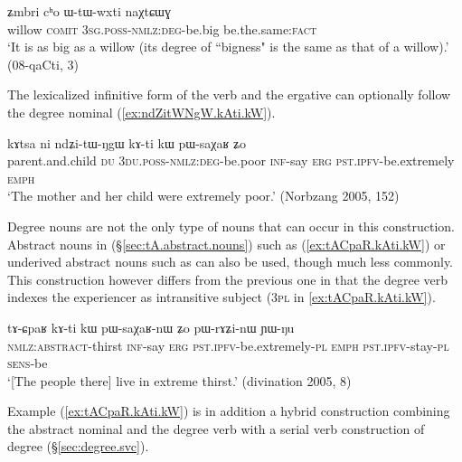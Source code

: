 \begin{exe}
\ex \label{ex:WtWwxti.naXtCWG}
\gll ʑmbri cʰo ɯ-tɯ-wxti naχtɕɯɣ \\
willow \textsc{comit} \textsc{3sg}.\textsc{poss}-\textsc{nmlz}:\textsc{deg}-be.big be.the.same:\textsc{fact} \\
\glt `It is as big as a willow (its degree of ``bigness" is the same as that of a willow).' (08-qaCti, 3)
\end{exe}

The lexicalized infinitive form  of the verb  and the ergative can optionally follow the degree nominal (\ref{ex:ndZitWNgW.kAti.kW}).

\begin{exe}
\ex \label{ex:ndZitWNgW.kAti.kW}
\gll kɤtsa ni ndʑi-tɯ-ŋgɯ kɤ-ti kɯ pɯ-saχaʁ ʑo \\
parent.and.child \textsc{du} \textsc{3du}.\textsc{poss}-\textsc{nmlz}:\textsc{deg}-be.poor \textsc{inf}-say \textsc{erg} \textsc{pst}.\textsc{ipfv}-be.extremely \textsc{emph} \\
\glt `The mother and her child were extremely poor.' (Norbzang 2005, 152)
\end{exe}

Degree nouns are not the only type of nouns that can occur in this construction. Abstract nouns in  (§\ref{sec:tA.abstract.nouns}) such as  (\ref{ex:tACpaR.kAti.kW}) or underived abstract nouns such as  can also be used, though much less commonly.  This construction however differs from the previous one in that the degree verb  indexes the experiencer as intransitive subject (\textsc{3pl} in \ref{ex:tACpaR.kAti.kW}).
  
\begin{exe}
\ex \label{ex:tACpaR.kAti.kW}
\gll  tɤ-ɕpaʁ kɤ-ti kɯ pɯ-saχaʁ-nɯ ʑo pɯ-rɤʑi-nɯ ɲɯ-ŋu  \\
\textsc{nmlz}:\textsc{abstract}-thirst \textsc{inf}-say \textsc{erg} \textsc{pst}.\textsc{ipfv}-be.extremely-\textsc{pl} \textsc{emph} \textsc{pst}.\textsc{ipfv}-stay-\textsc{pl} \textsc{sens}-be \\
\glt `[The people there] live in extreme thirst.' (divination 2005, 8)
\end{exe}

Example (\ref{ex:tACpaR.kAti.kW}) is in addition a hybrid construction combining the abstract nominal and the degree verb with a serial verb construction of degree (§\ref{sec:degree.svc}).

